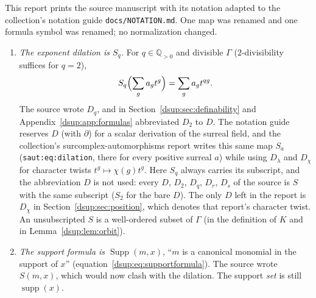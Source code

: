 \documentclass[11pt,oneside]{article}
\numberwithin{equation}{section}
\theoremstyle{definition}
\theoremstyle{remark}
\newcommand{\Q}{\mathbb Q}
\newcommand{\supp}{\operatorname{supp}}
\DeclareMathOperator{\Supp}{Supp}
\newcommand{\repo}[1]{\nolinkurl{#1}}%
\newcommand{\lbl}[1]{\nolinkurl{#1}}%
\begin{document}
This report prints the source manuscript with its notation adapted to the
collection's notation guide \repo{docs/NOTATION.md}. One map was renamed and
one formula symbol was renamed; no normalization changed.

\begin{enumerate}[leftmargin=*,itemsep=3pt]
\item \emph{The exponent dilation is $S_q$.} For $q\in\Q_{>0}$ and divisible
$\Gamma$ ($2$-divisibility suffices for $q=2$),
\[
 S_q\Bigl(\sum_g a_gt^g\Bigr)=\sum_g a_gt^{qg}.
\]
The source wrote $D_q$, and in Section~\ref{dsup:sec:definability} and
Appendix~\ref{dsup:app:formulas} abbreviated $D_2$ to $D$. The notation guide
reserves $D$ (with $\partial$) for a scalar derivation of the surreal field,
and the collection's surcomplex-automorphisms report writes this same map
$S_a$ (\lbl{saut:eq:dilation}, there for every positive surreal $a$) while
using $D_\lambda$ and $D_\chi$ for character twists
$t^g\mapsto\chi(g)t^g$. Here $S_q$ always carries its subscript, and the
abbreviation $D$ is not used: every $D$, $D_2$, $D_q$, $D_r$, $D_s$ of the
source is $S$ with the same subscript ($S_2$ for the bare $D$). The only
$D$ left in the report is $D_\chi$ in Section~\ref{dsup:sec:position}, which
denotes that report's character twist. An unsubscripted $S$ is a well-ordered subset of $\Gamma$ (in the definition
of $K$ and in Lemma~\ref{dsup:lem:orbit}).
\item \emph{The support formula is $\Supp(m,x)$}, ``$m$ is a canonical
monomial in the support of $x$'' (equation~\eqref{dsup:eq:supportformula}).
The source wrote $S(m,x)$, which would now clash with the dilation. The
support \emph{set} is still $\supp(x)$.
\end{enumerate}
\end{document}
